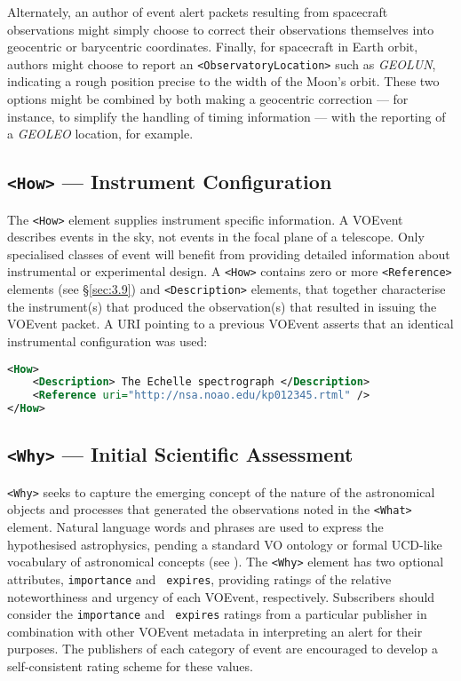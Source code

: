 \documentclass[11pt,a4paper]{ivoa}
\begin{document}
Alternately, an author of event alert packets resulting from spacecraft 
observations might simply choose to correct their observations themselves into 
geocentric or barycentric coordinates. Finally, for spacecraft in Earth orbit, 
authors might choose to report an \texttt{<ObservatoryLocation>} such as 
\emph{GEOLUN}, indicating a rough position precise to the width of the Moon's 
orbit. These two options might be combined by both making a geocentric 
correction --- for instance, to simplify the handling of timing information --- 
with the reporting of a \emph{GEOLEO} location, for example. 

\subsection{\texttt{<How>} --- Instrument Configuration}
\label{sec:3.5}
The \texttt{<How>} element supplies instrument specific information. A VOEvent 
describes events in the sky, not events in the focal plane of a telescope. Only 
specialised classes of event will benefit from providing detailed information 
about instrumental or experimental design. A \texttt{<How>} contains zero or more 
\texttt{<Reference>} elements (see \S\ref{sec:3.9}) and \texttt{<Description>} 
elements, that together characterise the instrument(s) that produced the 
observation(s) that resulted in issuing the VOEvent packet. A URI pointing to a 
previous VOEvent asserts that an identical instrumental configuration was used: 
\begin{lstlisting}[language=XML]
<How>
    <Description> The Echelle spectrograph </Description>
    <Reference uri="http://nsa.noao.edu/kp012345.rtml" />
</How>
\end{lstlisting}

\subsection{\texttt{<Why>} --- Initial Scientific Assessment}
\label{sec:3.6}
\texttt{<Why>} seeks to capture the emerging concept of the nature of the 
astronomical objects and processes that generated the observations noted in the 
\texttt{<What>} element. Natural language words and phrases are used to express the 
hypothesised astrophysics, pending a standard VO ontology or formal UCD-like 
vocabulary of astronomical concepts (see \citep{2018ivoa.spec.0527P}).
The \texttt{<Why>} element has two optional attributes, \texttt{importance} and \texttt{
expires}, providing ratings of the relative noteworthiness and urgency of each 
VOEvent, respectively. Subscribers should consider the \texttt{importance} and {\tt
expires} ratings from a particular publisher in combination with other VOEvent 
metadata in interpreting an alert for their purposes. The publishers of each 
category of event are encouraged to develop a self-consistent rating scheme for 
these values. 
\end{document}
